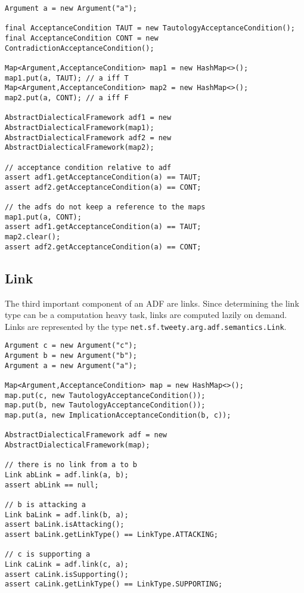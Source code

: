 \documentclass{scrartcl}[a4paper,10pt]
\newcommand{\jlstinline}[1]{\lstinline[style=java]|#1|}
\begin{document}
\begin{lstlisting}[style=java,caption=Access the acceptance conditions]
Argument a = new Argument("a");

final AcceptanceCondition TAUT = new TautologyAcceptanceCondition();
final AcceptanceCondition CONT = new ContradictionAcceptanceCondition();

Map<Argument,AcceptanceCondition> map1 = new HashMap<>();
map1.put(a, TAUT); // a iff T
Map<Argument,AcceptanceCondition> map2 = new HashMap<>();
map2.put(a, CONT); // a iff F

AbstractDialecticalFramework adf1 = new AbstractDialecticalFramework(map1);
AbstractDialecticalFramework adf2 = new AbstractDialecticalFramework(map2);

// acceptance condition relative to adf
assert adf1.getAcceptanceCondition(a) == TAUT;
assert adf2.getAcceptanceCondition(a) == CONT;

// the adfs do not keep a reference to the maps
map1.put(a, CONT);
assert adf1.getAcceptanceCondition(a) == TAUT;		
map2.clear();
assert adf2.getAcceptanceCondition(a) == CONT;
\end{lstlisting}

\subsection{Link}

The third important component of an ADF are links. Since determining the link type can be a computation heavy task, links are computed lazily on demand. Links are represented by the type \jlstinline{net.sf.tweety.arg.adf.semantics.Link}.

\begin{lstlisting}[style=java,caption=Access the links]
Argument c = new Argument("c");
Argument b = new Argument("b");
Argument a = new Argument("a");

Map<Argument,AcceptanceCondition> map = new HashMap<>();
map.put(c, new TautologyAcceptanceCondition());
map.put(b, new TautologyAcceptanceCondition());
map.put(a, new ImplicationAcceptanceCondition(b, c));

AbstractDialecticalFramework adf = new AbstractDialecticalFramework(map);

// there is no link from a to b
Link abLink = adf.link(a, b);
assert abLink == null;

// b is attacking a
Link baLink = adf.link(b, a);
assert baLink.isAttacking();
assert baLink.getLinkType() == LinkType.ATTACKING;

// c is supporting a
Link caLink = adf.link(c, a);
assert caLink.isSupporting();
assert caLink.getLinkType() == LinkType.SUPPORTING;
\end{lstlisting}
\end{document}
